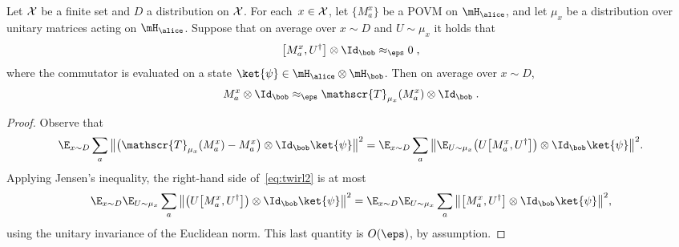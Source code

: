 \begin{lemma}
  \label{lem:mixing-U}
	Let $\cal{X}$ be a finite set and $D$ a distribution on $\cal{X}$. 
  For each~$x\in \cal{X}$, let $\{ M^x_a \}$ be a POVM on $\mH_\alice$, and let
  $\mu_x$ be a distribution over unitary matrices acting on $\mH_\alice$.
  Suppose that on average over $x \sim D$ and $U \sim \mu_x$ it holds that
  \begin{equation*}
    \bigl[ M^x_a , U^\dagger \bigr] \otimes \Id_\bob \approx_{\eps} 0\;,
  \end{equation*}
  where the commutator is evaluated on a state $\ket{\psi} \in \mH_\alice
  \otimes \mH_\bob$.
  Then on average over $x\sim D$,
  \begin{equation*}
    M^x_a \otimes \Id_\bob \approx_\eps \mathscr{T}_{\mu_x} ( M^x_a ) \otimes
    \Id_\bob \;.
  \end{equation*}
\end{lemma}

\begin{proof}
  Observe that
  \begin{equation}
    \E_{x\sim D} \sum_a \, \bigl\| \bigl( \mathscr{T}_{\mu_x} (M^x_a) - M^x_a
    \bigr) \otimes \Id_\bob \ket{\psi} \bigr\|^2 =
    \E_{x\sim D} \sum_a \, \bigl\| \E_{U\sim \mu_x} \bigl( U \big[ M^x_a, U^\dagger
    \bigr] \bigr) \otimes \Id_\bob \ket{\psi} \bigr\|^2.
    \label{eq:twirl2}
  \end{equation}
	Applying Jensen's inequality, the right-hand side of~\eqref{eq:twirl2} is at
  most
  \begin{equation*}
    \E_{x\sim D} \E_{U\sim \mu_x} \sum_a \, \bigl\| \bigl( U \big[ M^x_a, U^\dagger
    \bigr] \bigr) \otimes \Id_\bob \ket{\psi} \bigr\|^2
    = \E_{x\sim D} \E_{U\sim \mu_x} \sum_a \, \bigl\| \big[ M^x_a, U^\dagger
    \bigr]  \otimes \Id_\bob \ket{\psi} \bigr\|^2,
  \end{equation*}
  using the unitary invariance of the Euclidean norm.
  This last quantity is $O(\eps)$, by assumption.
\end{proof}


